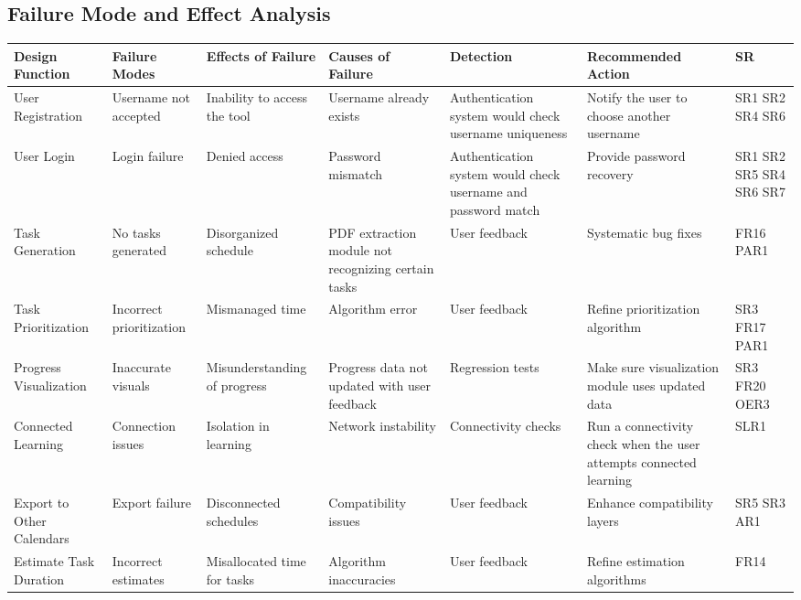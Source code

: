 \documentclass{article}
\begin{document}
\clearpage %
\begin{landscape}
\hspace*{-4cm}
\section{Failure Mode and Effect Analysis}


\begin{longtable}{|p{2cm}|p{3cm}|p{3cm}|p{3cm}|p{3cm}|p{3cm}|p{2cm}|}
\hline
\textbf{Design Function} & \textbf{Failure Modes} & \textbf{Effects of Failure} & \textbf{Causes of Failure} & \textbf{Detection} & \textbf{Recommended Action} & \textbf{SR} \\
\hline
User Registration & Username not accepted & Inability to access the tool & Username already exists & Authentication system would check username uniqueness & Notify the user to choose another username & SR1 SR2 SR4 SR6 \\
\hline
User Login & Login failure & Denied access & Password mismatch & Authentication system would check username and password match & Provide password recovery & SR1 SR2 SR5 SR4 SR6 SR7 \\
\hline
Task Generation & No tasks generated & Disorganized schedule & PDF extraction module not recognizing certain tasks & User feedback & Systematic bug fixes & FR16 PAR1 \\
\hline
Task Prioritization & Incorrect prioritization & Mismanaged time & Algorithm error & User feedback & Refine prioritization algorithm & SR3 FR17 PAR1 \\
\hline
Progress Visualization & Inaccurate visuals & Misunderstanding of progress & Progress data not updated with user feedback & Regression tests & Make sure visualization module uses updated data & SR3 FR20 OER3 \\
\hline
Connected Learning & Connection issues & Isolation in learning & Network instability & Connectivity checks & Run a connectivity check when the user attempts connected learning & SLR1 \\
\hline
Export to Other Calendars & Export failure & Disconnected schedules & Compatibility issues & User feedback & Enhance compatibility layers & SR5 SR3 AR1 \\
\hline
Estimate Task Duration & Incorrect estimates & Misallocated time for tasks & Algorithm inaccuracies & User feedback & Refine estimation algorithms & FR14 \\
\hline
\end{longtable}
\end{landscape}
\clearpage %
\end{document}
